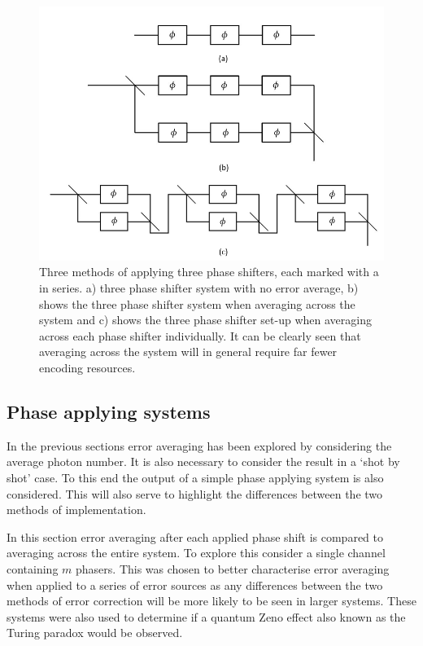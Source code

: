 \documentclass[aps,pra,twocolumn,superscriptaddress,numerical]{revtex4-1}
\begin{document}
		\begin{figure}
			\includegraphics[width=\columnwidth]{three_phase_applying_systems.PNG}
			
			\caption{Three methods of applying three phase shifters, each marked with a
				in series. a) three phase shifter system with no error average, b)
				shows the three phase shifter system when averaging across the system
				and c) shows the three phase shifter set-up when averaging across
				each phase shifter individually. It can be clearly seen that averaging
				across the system will in general require far fewer encoding resources.
				\label{fig:Different methods of implementation}}
			
			
		\end{figure}
		
		\subsection{Phase applying systems\label{Phase applying systems}}
		In the previous sections error averaging has been explored by considering the average photon number. It is also necessary to consider the result in a `shot by shot' case. To this end the output of a simple phase applying system is also considered. This will also serve to highlight the differences between the two methods of implementation.
		
		In this section error averaging after each applied phase shift is compared to averaging across the entire system. To explore this consider a single channel containing $m$ phasers. This was chosen to better characterise error averaging when applied to a series of error sources as any differences between the two methods of error correction will be more likely to be seen in larger systems. These systems were also used to determine if a quantum Zeno effect  \cite{expZeno} also known as the Turing paradox would be observed.
		
\end{document}
